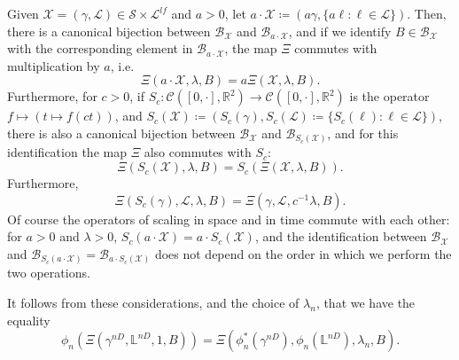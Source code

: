 \documentclass[11pt]{article}
\def\Att{{\Xi}}
\begin{document}
Given $\mathcal{X}=(\gamma,\mathcal{L})\in \mathscr{S}\times \mathscr{L}^{lf}$ and $a>0$, let $a\cdot \mathcal{X}\coloneqq(a \gamma, \{ a \ell: \ell\in \mathcal{L}\})$. Then,
there is a canonical bijection between $\mathcal{B}_{\mathcal{X}}$ and  $\mathcal{B}_{a\cdot \mathcal{X}}$, and if we identify $B\in \mathcal{B}_{\mathcal{X}}$
with the corresponding element in $ \mathcal{B}_{a \cdot\mathcal{X}}$, the map $\Att$ commutes with multiplication by $a$, i.e.
\begin{equation}
\Att(a\cdot \mathcal{X}, \lambda, B    )=a \Att(\mathcal{X},\lambda, B    ).
\end{equation}
Furthermore, for $c>0$, if $S_c: \mathcal{C}([0,\cdot],\mathbb{R}^2 )\to \mathcal{C}([0,\cdot],\mathbb{R}^2 )$ is the operator $f\mapsto (t\mapsto f(c t ))$,
and $S_c(\mathcal{X})\coloneqq(S_c(\gamma),S_c(\mathcal{L})\coloneqq \{S_c(\ell):\ell\in \mathcal{L}\})$, there is also a canonical bijection between $\mathcal{B}_{\mathcal{X}}$ and  $\mathcal{B}_{S_c (\mathcal{X}) }$, and for this identification the map $\Att$ also commutes with $S_c$:
\begin{equation}
\Att(S_c(\mathcal{X}), \lambda, B    )=S_c ( \Att(\mathcal{X},\lambda, B    ) ).
\end{equation}
Furthermore,
\begin{equation}
\Att( S_c(\gamma), \mathcal{L},\lambda,B )= \Att( \gamma, \mathcal{L},c^{-1}  \lambda,B ).
\end{equation}
Of course the operators of scaling in space and in time commute with each other: for $a>0$ and $\lambda>0$, $S_c(a\cdot \mathcal{X})=a\cdot S_c( \mathcal{X})$, and the identification between $\mathcal{B}_{\mathcal{X}}$ and $\mathcal{B}_{S_c(a\cdot \mathcal{X})}=\mathcal{B}_{a\cdot S_c( \mathcal{X})}$ does not depend on the order in which we perform the two operations.

It follows from these considerations, and the choice of $\lambda_n$, that we have the equality
\begin{equation}
\label{eq:scaling}
\phi_n( \Att({\gamma}^{nD},{\mathbb{L}}^{nD},1,B  )) =
  \Att(\phi^*_n(\gamma^{nD}),\phi_n(\mathbb{L}^{nD}),\lambda_n,B ).
\end{equation}
\end{document}
